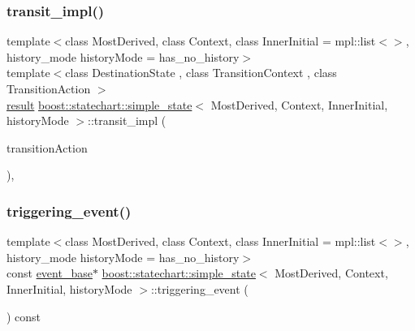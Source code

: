 \mbox{\label{classboost_1_1statechart_1_1simple__state_aa5c1618d959d881a51de119d12f6fc80}} 
\subsubsection{\texorpdfstring{transit\+\_\+impl()}{transit\_impl()}}
{\footnotesize\ttfamily template$<$class Most\+Derived, class Context, class Inner\+Initial = mpl\+::list$<$$>$, history\+\_\+mode history\+Mode = has\+\_\+no\+\_\+history$>$ \\
template$<$class Destination\+State , class Transition\+Context , class Transition\+Action $>$ \\
\mbox{\hyperlink{namespaceboost_1_1statechart_abe807f6598b614d6d87bb951ecd92331}{result}} \mbox{\hyperlink{classboost_1_1statechart_1_1simple__state}{boost\+::statechart\+::simple\+\_\+state}}$<$ Most\+Derived, Context, Inner\+Initial, history\+Mode $>$\+::transit\+\_\+impl (\begin{DoxyParamCaption}\item[{const Transition\+Action \&}]{transition\+Action }\end{DoxyParamCaption})\hspace{0.3cm}{\ttfamily [inline]}, {\ttfamily [private]}}

\mbox{\label{classboost_1_1statechart_1_1simple__state_aa8d3e7109aec6dd3b6b43e21159e2119}} 
\subsubsection{\texorpdfstring{triggering\+\_\+event()}{triggering\_event()}}
{\footnotesize\ttfamily template$<$class Most\+Derived, class Context, class Inner\+Initial = mpl\+::list$<$$>$, history\+\_\+mode history\+Mode = has\+\_\+no\+\_\+history$>$ \\
const \mbox{\hyperlink{classboost_1_1statechart_1_1event__base}{event\+\_\+base}}$\ast$ \mbox{\hyperlink{classboost_1_1statechart_1_1simple__state}{boost\+::statechart\+::simple\+\_\+state}}$<$ Most\+Derived, Context, Inner\+Initial, history\+Mode $>$\+::triggering\+\_\+event (\begin{DoxyParamCaption}{ }\end{DoxyParamCaption}) const\hspace{0.3cm}{\ttfamily [inline]}}



